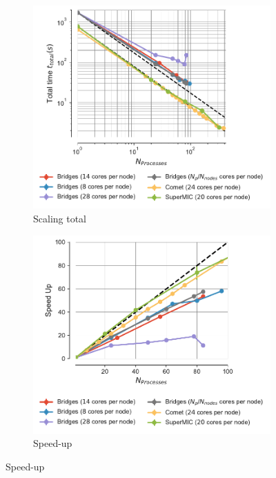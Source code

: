 \begin{figure}[!htb]
  \centering
  \begin{subfigure}{.49\textwidth}
    \includegraphics[width=\linewidth]{figures/Comparison_t-tot-clusters.pdf}
    \caption{Scaling total}
    \label{fig:MPIscaling-clusters}
  \end{subfigure}
  \hfill
  \begin{subfigure}{.49\textwidth}
    \includegraphics[width=\linewidth]{figures/Comparison_speed-up-clusters.pdf}
    \caption{Speed-up}
    \label{fig:MPIspeedup-clusters}
  \end{subfigure}
  \bigskip
  

\end{figure}
